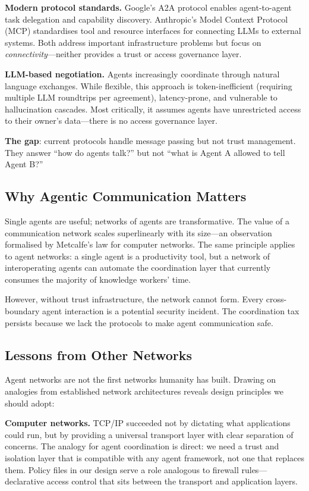 \textbf{Modern protocol standards.} Google's A2A protocol \cite{google2025a2a} enables agent-to-agent task delegation and capability discovery. Anthropic's Model Context Protocol (MCP) \cite{anthropic2024mcp} standardises tool and resource interfaces for connecting LLMs to external systems. Both address important infrastructure problems but focus on \textit{connectivity}---neither provides a trust or access governance layer.

\textbf{LLM-based negotiation.} Agents increasingly coordinate through natural language exchanges. While flexible, this approach is token-inefficient (requiring multiple LLM roundtrips per agreement), latency-prone, and vulnerable to hallucination cascades. Most critically, it assumes agents have unrestricted access to their owner's data---there is no access governance layer.

\textbf{The gap}: current protocols handle message passing but not trust management. They answer ``how do agents talk?'' but not ``what is Agent A allowed to tell Agent B?''

\subsection{Why Agentic Communication Matters}

Single agents are useful; networks of agents are transformative. The value of a communication network scales superlinearly with its size---an observation formalised by Metcalfe's law for computer networks. The same principle applies to agent networks: a single agent is a productivity tool, but a network of interoperating agents can automate the coordination layer that currently consumes the majority of knowledge workers' time.

However, without trust infrastructure, the network cannot form. Every cross-boundary agent interaction is a potential security incident. The coordination tax persists because we lack the protocols to make agent communication safe.

\subsection{Lessons from Other Networks}
\label{sec:rw_networks}

Agent networks are not the first networks humanity has built. Drawing on analogies from established network architectures reveals design principles we should adopt:

\textbf{Computer networks.} TCP/IP succeeded not by dictating what applications could run, but by providing a universal transport layer with clear separation of concerns. The analogy for agent coordination is direct: we need a trust and isolation layer that is compatible with any agent framework, not one that replaces them. Policy files in our design serve a role analogous to firewall rules---declarative access control that sits between the transport and application layers.


